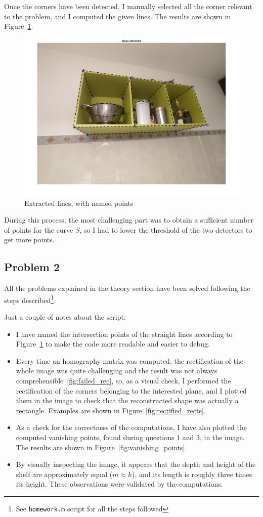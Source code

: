 \documentclass[a4paper, 11pt, oneside, openright, english]{article}
\begin{document}
Once the corners have been detected, I manually selected all the corner relevant to the problem, and I computed the given lines. The results are shown in Figure~\ref{fig:lines_extracted}.

\begin{figure}[H]
    \centering
    \includegraphics[width=.8\textwidth]{output/img_with_extracted_lines.png}
    \caption{Extracted lines, with named points}
    \label{fig:lines_extracted}
\end{figure}

During this process, the most challenging part was to obtain a sufficient number of points for the curve $S$, so I had to lower the threshold of the two detectors to get more points.

\subsection{Problem 2}

All the problems explained in the theory section have been solved following the steps described\footnote{See \texttt{homework.m} script for all the steps followed}.

\noindent Just a couple of notes about the script:
\begin{itemize}
    \item I have named the intersection points of the straight lines according to Figure~\ref{fig:lines_extracted} to make the code more readable and easier to debug.
    \item Every time an homography matrix was computed, the rectification of the whole image was quite challenging and the result was not always comprehensible~\ref{fig:failed_rec}, so, as a visual check, I performed the rectification of the corners belonging to the interested plane, and I plotted them in the image to check that the reconstructed shape was actually a rectangle. Examples are shown in Figure~\ref{fig:rectified_rects}.
    \item As a check for the correctness of the computations, I have also plotted the computed vanishing points, found during questions 1 and 3, in the image. The results are shown in Figure~\ref{fig:vanishing_points}.
    \item By visually inspecting the image, it appears that the depth and height of the shelf are approximately equal ($m \approx h$), and its length is roughly three times its height. These observations were validated by the computations.
\end{itemize}
\end{document}
